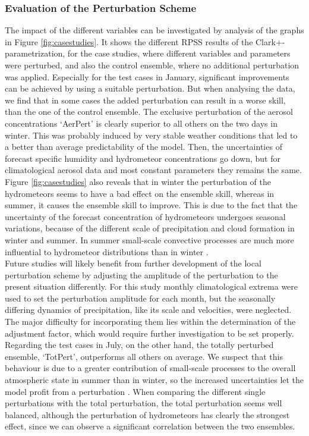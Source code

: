 \subsubsection{Evaluation of the Perturbation Scheme}
The impact of the different variables can be investigated by analysis of the graphs in Figure \ref{fig:casestudies}. It shows the different RPSS results of the Clark+-parametrization, for the case studies, where different variables and parameters were perturbed, and also the control ensemble, where no additional perturbation was applied. Especially for the test cases in January, significant improvements can be achieved by using a suitable perturbation. But when analysing the data, we find that in some cases the added perturbation can result in a worse skill, than the one of the control ensemble. The exclusive perturbation of the aerosol concentrations `AerPert' is clearly superior to all others on the two days in winter. This was probably induced by very stable weather conditions that led to a better than average predictability of the model. Then, the uncertainties of forecast specific humidity and hydrometeor concentrations go down, but for climatological aerosol data and most constant parameters they remains the same. Figure \ref{fig:casestudies} also reveals that in winter the perturbation of the hydrometeors seems to have a bad effect on the ensemble skill, whereas in summer, it causes the ensemble skill to improve. This is due to the fact that the uncertainty of the forecast concentration of hydrometeors undergoes seasonal variations, because of the different scale of precipitation and cloud formation in winter and summer. In summer small-scale convective processes are much more influential to hydrometeor distributions than in winter  \cite{kidd2012}. \\
Future studies will likely benefit from further development of the local perturbation scheme by adjusting the amplitude of the perturbation to the present situation differently. For this study monthly climatological extrema were used to set the perturbation amplitude for each month, but the seasonally differing dynamics of precipitation, like its scale and velocities, were neglected. The major difficulty for incorporating them lies within the determination of the adjustment factor, which would require further investigation to be set properly.\\
Regarding the test cases in July, on the other hand, the totally perturbed ensemble, `TotPert', outperforms all others on average. We suspect that this behaviour is due to a greater contribution of small-scale processes  to the overall atmospheric state in summer than in winter, so the increased uncertainties let the model profit from a perturbation \cite{kidd2012}. When comparing the different single perturbations with the total perturbation, the total perturbation seems well balanced, although the perturbation of hydrometeors has clearly the strongest effect, since we can observe a significant correlation between the two ensembles.\\
